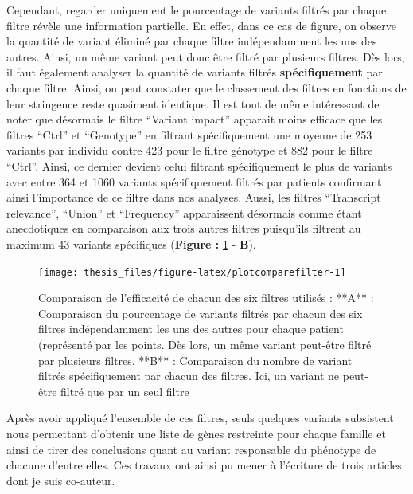 \documentclass[12pt,twoside]{reedthesis}
\theoremstyle{definition}
\theoremstyle{definition}
\theoremstyle{remark}
\begin{document}
  Cependant, regarder uniquement le pourcentage de variants filtrés par
  chaque filtre révèle une information partielle. En effet, dans ce cas de
  figure, on observe la quantité de variant éliminé par chaque filtre
  indépendamment les uns des autres. Ainsi, un même variant peut donc être
  filtré par plusieurs filtres. Dès lors, il faut également analyser la
  quantité de variants filtrés \textbf{spécifiquement} par chaque filtre.
  Ainsi, on peut constater que le classement des filtres en fonctions de
  leur stringence reste quasiment identique. Il est tout de même
  intéressant de noter que désormais le filtre ``Variant impact'' apparait
  moins efficace que les filtres ``Ctrl'' et ``Genotype'' en filtrant
  spécifiquement une moyenne de 253 variants par individu contre 423 pour
  le filtre génotype et 882 pour le filtre ``Ctrl''. Ainsi, ce dernier
  devient celui filtrant spécifiquement le plus de variants avec entre 364
  et 1060 variants spécifiquement filtrés par patients confirmant ainsi
  l'importance de ce filtre dans nos analyses. Aussi, les filtres
  ``Transcript relevance'', ``Union'' et ``Frequency'' apparaissent
  désormais comme étant anecdotiques en comparaison aux trois autres
  filtres puisqu'ils filtrent au maximum 43 variants spécifiques
  (\textbf{Figure :} \ref{fig:plotcomparefilter} - \textbf{B}).
  
  \newpage
  
  \begin{figure}
  
  {\centering \texttt{[image: thesis\_files/figure-latex/plotcomparefilter-1]} 
  
  }
  
  \caption[Comparaison de l'efficacité de chacun des six filtres utilisés]{Comparaison de l'efficacité de chacun des six filtres utilisés : **A** : Comparaison du pourcentage de variants filtrés par chacun des six filtres indépendamment les uns des autres pour chaque patient (représenté par les points. Dès lors, un même variant peut-être filtré par plusieurs filtres. **B** : Comparaison du nombre de variant filtrés spécifiquement par chacun des filtres. Ici, un variant ne peut-être filtré que par un seul filtre}\label{fig:plotcomparefilter}
  \end{figure}
  
  Après avoir appliqué l'ensemble de ces filtres, seuls quelques variants
  subsistent nous permettant d'obtenir une liste de gènes restreinte pour
  chaque famille et ainsi de tirer des conclusions quant au variant
  responsable du phénotype de chacune d'entre elles. Ces travaux ont ainsi
  pu mener à l'écriture de trois articles dont je suis co-auteur.
  
\end{document}

